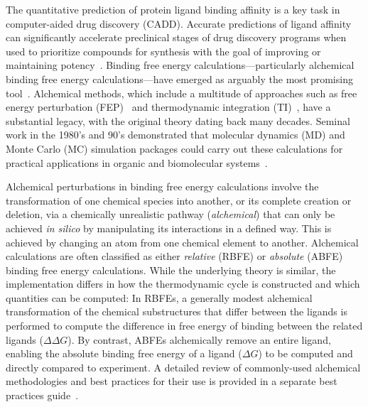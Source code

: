 \documentclass[9pt,bestpractices,pubversion]{livecoms}
\begin{document}
The quantitative prediction of protein ligand binding affinity is a key task in computer-aided drug discovery (CADD). 
Accurate predictions of ligand affinity can significantly accelerate preclinical stages of drug discovery programs when used to prioritize compounds for synthesis with the goal of improving or maintaining potency~\cite{abelCriticalReviewValidation2017,abelModelingValuePredictive2018}. 
Binding free energy calculations---particularly alchemical binding free energy calculations---have emerged as arguably the most promising tool~\cite{courniaRelativeBindingFree2017}. 
Alchemical methods, which include a multitude of approaches such as free energy perturbation (FEP)~\cite{zwanzigHighTemperatureEquation1954,bennettEfficientEstimationFree1976} and thermodynamic integration (TI)~\cite{kirkwoodQuantumStatisticsAlmost1933,kirkwoodQuantumStatisticsAlmost1934,kirkwoodStatisticalMechanicsFluid1935}, have a substantial legacy, with the original theory dating back many decades. 
Seminal work in the 1980’s and 90’s demonstrated that molecular dynamics (MD) and Monte Carlo (MC) simulation packages could carry out these calculations for practical applications in organic and biomolecular systems~\cite{jorgensenMonteCarloSimulation1985,straatsmaFreeEnergyHydrophobic1986,lybrandTheoreticalCalculationRelative1986,merzFreeEnergyPerturbation1989,pearlmanDeterminationDifferentialEffects1995,choderaAlchemicalFreeEnergy2011,mobleyPerspectiveAlchemicalFree2012}. 

Alchemical perturbations in binding free energy calculations involve the transformation of one chemical species into another, or its complete creation or deletion, via a chemically unrealistic pathway (\emph{alchemical}) that can only be achieved \textit{in silico} by manipulating its interactions in a defined way. This is achieved by changing an atom from one chemical element to another.
Alchemical calculations are often classified as either \emph{relative} (RBFE) or \emph{absolute} (ABFE) binding free energy calculations. 
While the underlying theory is similar, the implementation differs in how the thermodynamic cycle is constructed and which quantities can be computed:
In RBFEs, a generally modest alchemical transformation of the chemical substructures that differ between the ligands is performed to compute the difference in free energy of binding between the related ligands ($\Delta \Delta G$).
By contrast, ABFEs alchemically remove an entire ligand, enabling the absolute binding free energy of a ligand ($\Delta G$) to be computed and directly compared to experiment.
A detailed review of commonly-used alchemical methodologies and best practices for their use is provided in a separate best practices guide~\cite{meyBestPracticesAlchemical2020}.
\end{document}

